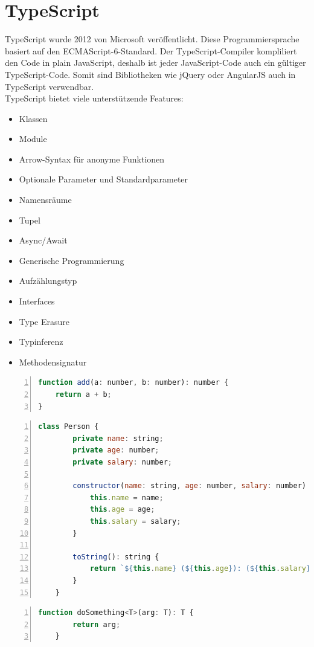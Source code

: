 \section{TypeScript}
TypeScript wurde 2012 von Microsoft veröffentlicht. Diese Programmiersprache basiert auf den ECMAScript-6-Standard. Der TypeScript-Compiler kompliliert den Code in plain JavaScript, deshalb ist jeder JavaScript-Code auch ein gültiger TypeScript-Code. Somit sind Bibliotheken wie jQuery oder AngularJS auch in TypeScript verwendbar. \autocite{wikiTypeScript} \\
TypeScript bietet viele unterstützende Features:
\begin{itemize}
	\item Klassen
	\item Module
	\item Arrow-Syntax für anonyme Funktionen
	\item Optionale Parameter und Standardparameter
	\item Namensräume
	\item Tupel
	\item Async/Await
	\item Generische Programmierung
	\item Aufzählungstyp
	\item Interfaces
	\item Type Erasure
	\item Typinferenz
	\item Methodensignatur
\end{itemize}

\begin{lstlisting}[caption={TypeScript-Beispiel Function},captionpos=b, numbers=left, backgroundcolor=\color{black!10},language=JavaScript]
function add(a: number, b: number): number {
	return a + b;
}
\end{lstlisting}
\begin{lstlisting}[caption={TypeScript-Beispiel Klasse},captionpos=b, numbers=left, backgroundcolor=\color{black!10},language=JavaScript]
	class Person {
		private name: string;
		private age: number;
		private salary: number;
		
		constructor(name: string, age: number, salary: number) {
			this.name = name;
			this.age = age;
			this.salary = salary;
		}
		
		toString(): string {
			return `${this.name} (${this.age}): (${this.salary})`;
		}
	}
\end{lstlisting}
\begin{lstlisting}[caption={TypeScript-Beispiel Generische Programmierung},captionpos=b, numbers=left, backgroundcolor=\color{black!10},language=JavaScript]
	function doSomething<T>(arg: T): T {
		return arg;
	}
\end{lstlisting}

